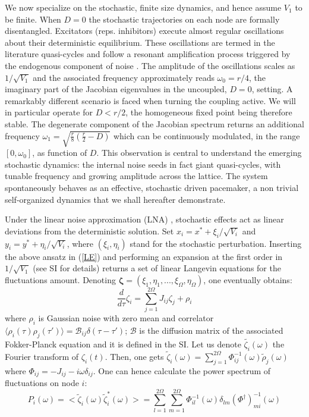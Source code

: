 \documentclass[showpacs,prl,superscriptaddress,nofootinbib, twocolumn]{revtex4}
\begin{document}
We now specialize on the stochastic, finite size dynamics, and hence assume $V_1$ to be finite. When $D=0$  the stochastic trajectories on each node are formally disentangled. 
Excitators (reps. inhibitors) execute almost regular oscillations about their deterministic equilibrium. These oscillations are termed in the literature quasi-cycles \cite{mckanenewman,dauxois} and follow a resonant amplification process triggered by the endogenous component of noise \cite{bartlett}. The amplitude of the oscillations scales as $1/\sqrt{V_1}$ and the associated frequency approximately reads $\omega_0 = r/4$, the imaginary part 
of the Jacobian eigenvalues in the uncoupled, $D=0$, setting. A remarkably different scenario is faced when turning the coupling active. We will in particular operate for $D<r/2$, the homogeneous fixed point being 
therefore stable. The degenerate component of the Jacobian spectrum returns an additional frequency $\omega_1 = \sqrt{\frac{r}{8}\left( \frac{r}{2}-D \right) }$ which can be continuously modulated, in the range $[0, \omega_0]$, as function of $D$. This observation is central to understand the emerging stochastic dynamics: the internal noise seeds in fact giant quasi-cycles, with tunable frequency and growing amplitude across the lattice. The system spontaneously behaves as an effective, stochastic driven pacemaker, a non trivial self-organized dynamics that we shall hereafter demonstrate. 

Under the  linear noise approximation (LNA) \cite{vankampen, gardiner}, stochastic effects act as linear deviations from the deterministic solution. Set $x_i=x^*+ \xi_i / \sqrt{V_i}$ 
and $y_i=y^*+ \eta_i / \sqrt{V_i}$, where $(\xi_i,\eta_i)$ stand for the stochastic perturbation. Inserting the 
above ansatz in (\ref{LE}) and performing an expansion at the first order in $1/ \sqrt{V_1}$  (see SI for details) returns 
a set of linear Langevin equations for the fluctuations amount. Denoting ${\boldsymbol \zeta}=(\xi_1,\eta_1, ... , \xi_\Omega, \eta_\Omega)$, one eventually obtains:
\begin{equation}
\label{LLE}
\frac{d}{d \tau} \zeta_i = \sum_{j=1}^{2 \Omega} J_{ij} \zeta_j + \rho_i
\end{equation}
where $\rho_i$ is Gaussian noise with zero mean and correlator  $\langle \rho_i (\tau) \rho_j (\tau') \rangle = {\mathcal B_{ij}} \delta (\tau-\tau')$; ${\boldsymbol {\mathcal B}}$ is the diffusion matrix of the associated Fokker-Planck equation and it is defined in the SI.  Let us denote $\tilde{\zeta_i}(\omega)$ the Fourier transform of $\zeta_i(t)$. Then, one gets $\tilde{\zeta}_i (\omega) = \sum^{2 \Omega}_{j=1} \Phi^{-1}_{ij}(\omega) \tilde{\rho}_j(\omega)$ where  $\Phi_{ij}=- J_{ij}-i \omega \delta_{ij}$. One can hence calculate the power spectrum of fluctuations on node $i$:
\begin{equation}
\label{PS}
P_{i} (\omega)= <\tilde{\zeta}_i(\omega)\tilde{\zeta}_i^*(\omega)> = \sum^{2 \Omega}_{l=1}\sum^{2 \Omega}_{m=1} \Phi^{-1}_{il} (\omega)\delta_{lm} \left( \Phi^{\dag} \right)^{-1}_{mi}(\omega)
\end{equation}
\end{document}
